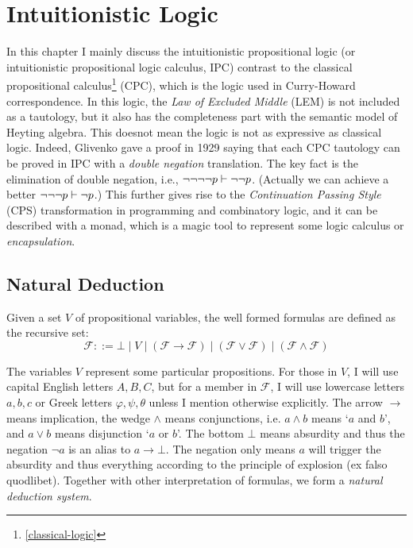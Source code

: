 \chapter{Intuitionistic Logic}
\label{intuitionistic-logic}

In this chapter I mainly discuss the intuitionistic propositional logic
(or intuitionistic propositional logic calculus, IPC) contrast to the
classical propositional calculus\footnote{\autoref{classical-logic}} 
(CPC), which is the logic used
in Curry-Howard correspondence. In this logic, the {\it Law of Excluded
Middle} (LEM) is not included as a tautology, but it also has the 
completeness part with the semantic model of Heyting algebra. 
This doesnot mean the logic is not as expressive as classical logic.
Indeed, Glivenko gave a proof in 1929 \cite{glivenko1929quelques} saying
that each CPC tautology can be proved in IPC with a {\it double negation}
translation. The key fact is the elimination of double negation, i.e.,
$\neg\neg\neg\neg p\vdash \neg\neg p$. (Actually we can achieve a better
$\neg\neg\neg p\vdash\neg p$.) This further gives rise to the {\it
Continuation Passing Style} (CPS) transformation in programming and 
combinatory logic, and it can be described with a monad, which is a
magic tool to represent some logic calculus or {\it encapsulation}.

\section{Natural Deduction}
\newcommand{\formula}{\mathscr{F}}

Given a set $V$ of propositional variables, the well formed
formulas are defined as the recursive set:
$$
    \formula ::= \bot 
        \mid V 
        \mid (\formula \to \formula) 
        \mid (\formula \vee \formula)
        \mid (\formula \wedge \formula)
$$

The variables $V$ represent some particular propositions. For those in
$V$, I will use capital English letters $A,B,C$, but for a member in 
$\formula$, I will use lowercase letters $a,b,c$ or Greek letters 
$\varphi,\psi,\theta$ unless I mention otherwise explicitly. 
The arrow $\to$ means implication, the wedge $\wedge$
means conjunctions, i.e. $a\wedge b$ means `$a$ and $b$', and
$a\vee b$ means disjunction `$a$ or $b$'. The bottom $\bot$ means 
absurdity and thus the negation $\neg a$ is an alias to $a\to\bot$.
The negation only means $a$ will trigger the absurdity and thus everything
according to the principle of explosion (ex falso quodlibet). Together
with other interpretation of formulas, we form a {\it natural deduction
system}. 


